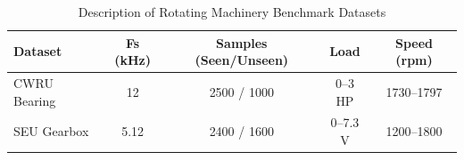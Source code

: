 \begin{table}[htbp]
\centering
\caption{Description of Rotating Machinery Benchmark Datasets}
\label{tab:datasets}
\begin{tabular}{lcccc}
\toprule
\textbf{Dataset} & \textbf{Fs (kHz)} & \textbf{Samples (Seen/Unseen)} & \textbf{Load} & \textbf{Speed (rpm)} \\
\midrule
CWRU Bearing & 12 & 2500 / 1000 & 0--3 HP & 1730--1797 \\
SEU Gearbox & 5.12 & 2400 / 1600 & 0--7.3 V & 1200--1800 \\
\bottomrule
\end{tabular}
\end{table}
